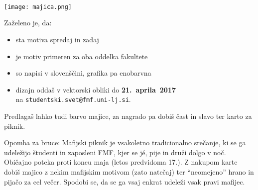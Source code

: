 \documentclass[a4paper,oneside,12pt]{article}
\title{\Title}
\author{\Author}
\date{\today}
\theoremstyle{definition}
\newcommand{\veliko}[1]{\scalebox{4}{#1}}
\newcommand{\srednje}[1]{\scalebox{2.5}{#1}}
\begin{document}
\begin{center}
  \srednje{ŠS FMF razpisuje natečaj}

  \setlength{\baselineskip}{40pt}
  \vspace{-35pt}
  \srednje{za} \\
  \veliko{\bf dizajn majice} \\
  \srednje{za} \\[10pt]
  \veliko{\bf Mafijski piknik 2017!}

  \vspace{-15pt}
  \texttt{[image: majica.png]}
\end{center}

\fontsize{24}{26}\selectfont

\vspace{-65pt}
Zaželeno je, da:
\vspace{-35pt}
\begin{itemize}
  \item sta motiva spredaj in zadaj
  \item je motiv primeren za oba oddelka fakultete
  \item so napisi v slovenščini, grafika pa enobarvna
  \item dizajn oddaš v vektorski obliki do \textbf{21.~aprila~2017} \\[5pt]
        na \texttt{studentski.svet@fmf.uni-lj.si}.
\end{itemize}
\vspace{-25pt}
Predlagaš lahko tudi barvo majice, za nagrado pa dobiš čast in slavo ter karto za piknik.

\fontsize{10}{11}\selectfont
Opomba za bruce: Mafijski piknik je vsakoletno tradicionalno srečanje, ki se ga
udeležijo študenti in zaposleni FMF, kjer se j\'{e}, pije in druži dolgo v noč.
Običajno poteka proti koncu maja (letos predvidoma 17.). Z nakupom karte dobiš
majico z nekim mafijskim motivom (zato natečaj) ter ``neomejeno'' hrano in
pijačo za cel večer. Spodobi se, da se ga vsaj enkrat udeleži vsak pravi
mafijec.
\end{document}
